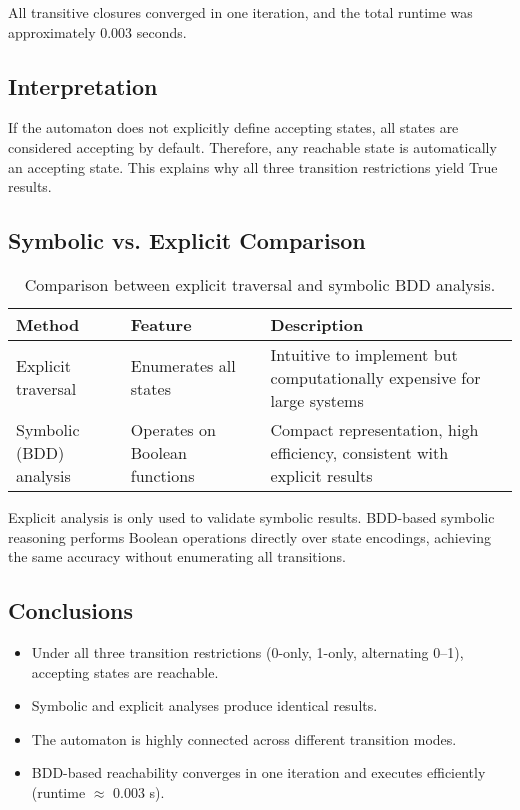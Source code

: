 \documentclass[a4paper,11pt]{article}
\begin{document}
All transitive closures converged in one iteration,
and the total runtime was approximately 0.003 seconds.



\subsection*{Interpretation}

If the automaton does not explicitly define accepting states,
all states are considered accepting by default.
Therefore, any reachable state is automatically an accepting state.
This explains why all three transition restrictions yield True results.



\subsection*{Symbolic vs. Explicit Comparison}

\begin{table}[h]
\centering
\begin{tabular}{l|l|p{7cm}}
\textbf{Method} & \textbf{Feature} & \textbf{Description} \\\hline
Explicit traversal & Enumerates all states & Intuitive to implement but computationally expensive for large systems \\
Symbolic (BDD) analysis & Operates on Boolean functions & Compact representation, high efficiency, consistent with explicit results \\
\end{tabular}
\caption{Comparison between explicit traversal and symbolic BDD analysis.}
\end{table}

Explicit analysis is only used to validate symbolic results.
BDD-based symbolic reasoning performs Boolean operations directly over state encodings,
achieving the same accuracy without enumerating all transitions.



\subsection*{Conclusions}

\begin{itemize}
  \item Under all three transition restrictions (0-only, 1-only, alternating 0–1),
        accepting states are reachable.
  \item Symbolic and explicit analyses produce identical results.
  \item The automaton is highly connected across different transition modes.
  \item BDD-based reachability converges in one iteration and executes efficiently
        (runtime $\approx$ 0.003 s).
\end{itemize}
\end{document}
